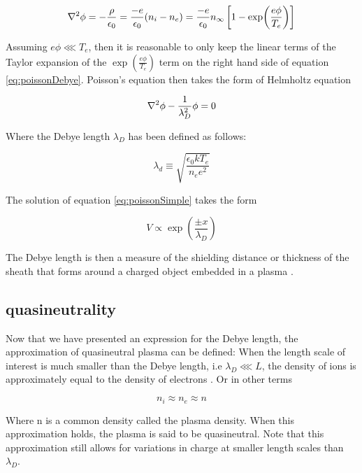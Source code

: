 \begin{equation}\label{eq:poissonDebye}
    \laplacian{\phi}  = - \frac{\rho}{\epsilon_0} = \frac{-e}{\epsilon_0} (n_i - n_e) = \frac{-e}{\epsilon_0} n_{\infty} \left[1 - \exp (\frac{e \phi}{T_e}) \right]
\end{equation}

Assuming $e \phi \lll T_e$, then it is reasonable to only keep the linear terms of the Taylor expansion of the $\exp (\frac{e \phi}{T_e})$ term on the right hand side of equation \eqref{eq:poissonDebye}. Poisson's equation then takes the form of Helmholtz equation

\begin{equation}\label{eq:poissonSimple}
    \laplacian{\phi} - \frac{1}{\lambda_D^2} \phi = 0
\end{equation}


Where the Debye length $\lambda_D$ has been defined as follows:

\begin{equation}\label{eq:Helmholtz}
    \lambda_d \equiv \sqrt{\frac{\epsilon_0 k T_e}{n_e e^2}}
\end{equation}

The solution of equation \eqref{eq:poissonSimple} takes the form

\begin{equation*}
    V \propto \exp (\frac{\pm x}{\lambda_D})
\end{equation*}

The Debye length is then a measure of the shielding distance or thickness of the sheath that forms around a charged object embedded in a plasma \parencite[Section 1.4]{Chen2018}.


\subsection{quasineutrality}
Now that we have presented an expression for the Debye length, the approximation of quasineutral plasma can be defined: When the length scale of interest is much smaller than the Debye length, i.e $\lambda_D \lll L$, the density of ions is approximately equal to the density of electrons \parencite[Section 1.4]{Chen2018}. Or in other terms

\begin{equation}
    n_i \approx n_e \approx n
\end{equation}

Where n is a common density called the plasma density. When this approximation holds, the plasma is said to be quasineutral. Note that this approximation still allows for variations in charge at smaller length scales than $\lambda_D$. 

